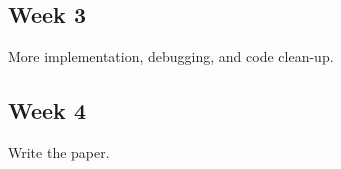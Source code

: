 \documentclass[%
        final,
        notitlepage,
        narroweqnarray,
        inline,
        twoside,
        ]{ieee}
\begin{document}
\subsection*{Week 3}
More implementation, debugging, and code clean-up.

\subsection*{Week 4}
Write the paper.






\end{document}

